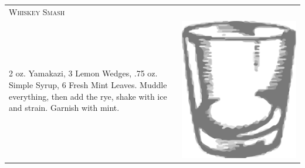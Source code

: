 \documentclass{article}
\begin{document}
\begin{multicols}{2}
\begin{tabular}{p{2in} p{0.5in}}
\multicolumn{2}{p{3in}}{\centering\Huge\textsc{Whiskey Smash}} \\ 
  \vspace{-0.1in}2 oz. Yamakazi, 3 Lemon Wedges, .75 oz.  Simple Syrup, 6 Fresh Mint Leaves. Muddle everything, then add the rye, shake with ice and strain. Garnish with mint. &
  \vspace{-0.1in} \includegraphics{rocks_glass.png}
\end{tabular}
\end{multicols}
\end{document}
